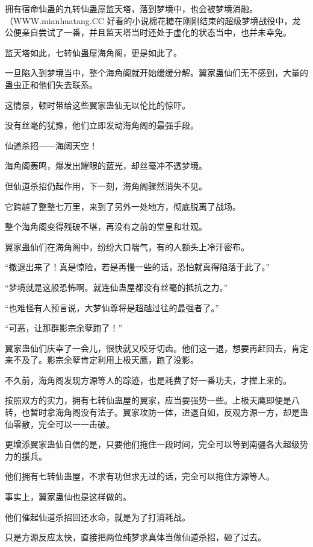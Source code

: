 
\begin{this_body}

拥有宿命仙蛊的九转仙蛊屋监天塔，落到梦境中，也会被梦境消融。（WWW.mianhuatang.CC 好看的小说棉花糖在刚刚结束的超级梦境战役中，龙公便亲自尝试了一番，并且监天塔当时还处于虚化的状态当中，也并未幸免。

监天塔如此，七转仙蛊屋海角阁，更是如此了。

一旦陷入到梦境当中，整个海角阁就开始缓缓分解。翼家蛊仙们无不感到，大量的蛊虫正和他们失去联系。

这情景，顿时带给这些翼家蛊仙无以伦比的惊吓。

没有丝毫的犹豫，他们立即发动海角阁的最强手段。

仙道杀招――海阔天空！

海角阁轰鸣，爆发出耀眼的蓝光，却丝毫冲不透梦境。

但仙道杀招仍起作用，下一刻，海角阁骤然消失不见。

它跨越了整整七万里，来到了另外一处地方，彻底脱离了战场。

整个海角阁变得残破不堪，再没有之前的堂皇和壮观。

翼家蛊仙们在海角阁中，纷纷大口喘气，有的人额头上冷汗密布。

“撤退出来了！真是惊险，若是再慢一些的话，恐怕就真得陷落于此了。”

“梦境就是这般恐怖啊。就连仙蛊屋都没有丝毫的抵抗之力。”

“也难怪有人预言说，大梦仙尊将是超越过往的最强者了。”

“可恶，让那群影宗余孽跑了！”

翼家蛊仙们庆幸了一会儿，很快就又咬牙切齿。他们这一退，想要再赶回去，肯定来不及了。影宗余孽肯定利用上极天鹰，跑了没影。

不久前，海角阁发现方源等人的踪迹，也是耗费了好一番功夫，才撵上来的。

按照双方的实力，拥有七转仙蛊屋的翼家，应当要强势一些。上极天鹰即便是八转，也暂时拿海角阁没有法子。翼家攻防一体，进退自如，反观方源一方，却是蛊仙零散，完全可以一一击破。

更增添翼家蛊仙自信的是，只要他们拖住一段时间，完全可以等到南疆各大超级势力的援兵。

他们拥有七转仙蛊屋，不求有功但求无过的话，完全可以拖住方源等人。

事实上，翼家蛊仙也是这样做的。

他们催起仙道杀招回还水命，就是为了打消耗战。

只是方源反应太快，直接把两位纯梦求真体当做仙道杀招，砸了过去。


\end{this_body}
